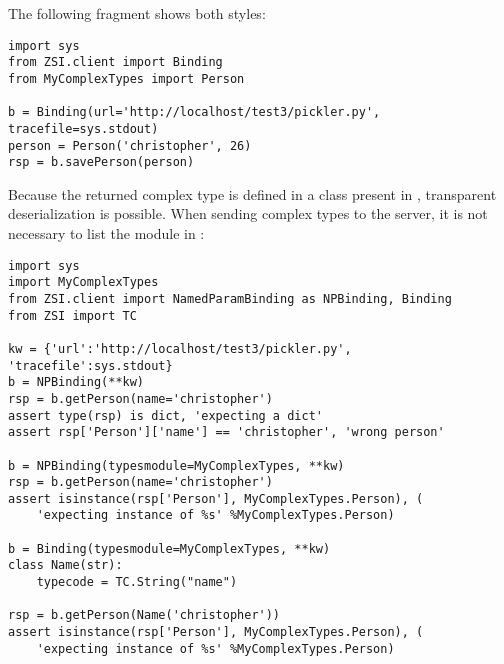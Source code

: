 The following fragment shows both styles:

\begin{verbatim}
import sys
from ZSI.client import Binding
from MyComplexTypes import Person

b = Binding(url='http://localhost/test3/pickler.py', tracefile=sys.stdout)
person = Person('christopher', 26)
rsp = b.savePerson(person)

\end{verbatim}

Because the returned complex type is defined in a class present in 
, transparent deserialization is possible.  When sending
complex types to the server, it is not necessary to list the module
in :

\begin{verbatim}
import sys
import MyComplexTypes
from ZSI.client import NamedParamBinding as NPBinding, Binding
from ZSI import TC

kw = {'url':'http://localhost/test3/pickler.py', 'tracefile':sys.stdout}
b = NPBinding(**kw)
rsp = b.getPerson(name='christopher')
assert type(rsp) is dict, 'expecting a dict'
assert rsp['Person']['name'] == 'christopher', 'wrong person'

b = NPBinding(typesmodule=MyComplexTypes, **kw)
rsp = b.getPerson(name='christopher')
assert isinstance(rsp['Person'], MyComplexTypes.Person), (
    'expecting instance of %s' %MyComplexTypes.Person)

b = Binding(typesmodule=MyComplexTypes, **kw)
class Name(str):
    typecode = TC.String("name")

rsp = b.getPerson(Name('christopher'))
assert isinstance(rsp['Person'], MyComplexTypes.Person), (
    'expecting instance of %s' %MyComplexTypes.Person)

\end{verbatim}



